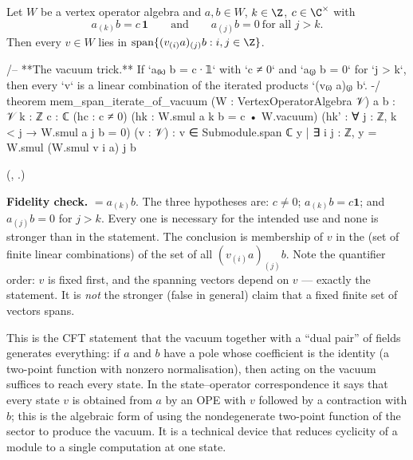 \begin{theorem}\label{ch11:thm:vacuumtrick}
Let $W$ be a vertex operator algebra and $a,b\in W$, $k\in\Z$, $c\in\C^\times$ with
\begin{equation*}
  a_{(k)}b=c\,\mathbf 1\qquad\text{and}\qquad a_{(j)}b=0\ \text{for all }j>k .
\end{equation*}
Then every $v\in W$ lies in $\operatorname{span}\{(v_{(i)}a)_{(j)}b : i,j\in\Z\}$.
\end{theorem}
\begin{leancode}
/-- **The vacuum trick.**  If `a₍ₖ₎ b = c·𝟙` with `c ≠ 0` and `a₍ⱼ₎ b = 0` for `j > k`, then every
`v` is a linear combination of the iterated products `(v₍ᵢ₎ a)₍ⱼ₎ b`. -/
theorem mem_span_iterate_of_vacuum (W : VertexOperatorAlgebra 𝒱) {a b : 𝒱} {k : ℤ} {c : ℂ}
    (hc : c ≠ 0) (hk : W.smul a k b = c • W.vacuum)
    (hk' : ∀ j : ℤ, k < j → W.smul a j b = 0) (v : 𝒱) :
    v ∈ Submodule.span ℂ {y | ∃ i j : ℤ, y = W.smul (W.smul v i a) j b}
\end{leancode}
(, .)
\begin{dictionary}
\textbf{Fidelity check.}   $=a_{(k)}b$.  The three hypotheses are: $c\ne0$;
$a_{(k)}b=c\mathbf 1$; and $a_{(j)}b=0$ for $j>k$.  Every one is necessary for the intended use and
none is stronger than in the statement.  The conclusion is membership of $v$ in the
 (set of finite linear combinations) of the set of all $(v_{(i)}a)_{(j)}b$.
Note the quantifier order: $v$ is fixed first, and the spanning vectors depend on $v$ --- exactly
the statement.  It is \emph{not} the stronger (false in general) claim that a fixed finite set of
vectors spans.
\end{dictionary}

\begin{physics}
This is the CFT statement that the vacuum together with a ``dual pair'' of fields generates everything: if $a$ and $b$ have a pole whose coefficient is the identity (a two-point function with nonzero normalisation), then acting on the vacuum suffices to reach every state. In the state--operator correspondence it says that every state $v$ is obtained from $a$ by an OPE with $v$ followed by a contraction with $b$; this is the algebraic form of using the nondegenerate two-point function of the sector to produce the vacuum. It is a technical device that reduces cyclicity of a module to a single computation at one state.
\end{physics}

